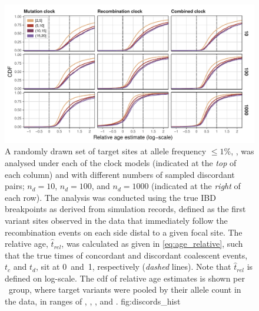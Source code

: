 

\begin{figure}[!htb]
\includegraphics[width=\textwidth]{./img/ch5/discords_hist}
{A randomly drawn set of  target sites at allele frequency ${\leq 1\%}$, \ie \fk{[2,20]}, was analysed under each of the  clock models (indicated at the \emph{top} of each column) and with different numbers of sampled discordant pairs; ${n_d = \num{10}}$, ${n_d = \num{100}}$, and ${n_d = \num{1000}}$ (indicated at the \emph{right} of each row).
The analysis was conducted using the true IBD breakpoints as derived from simulation records, defined as the first variant sites observed in the data that immediately follow the  recombination events on each side distal to a given focal site.
The relative age, ${\hat{t}_\textit{rel}}$, was calculated as given in \cref{eq:age_relative}, such that the true times of concordant and discordant coalescent events, $t_c$ and $t_d$, sit at 0~and~1, respectively (\emph{dashed} lines).
Note that ${\hat{t}_\textit{rel}}$ is defined on log-scale.
The \gls{cdf} of relative age estimates is shown per \fk{}~group, where target variants were pooled by their allele count in the data, in ranges of \fk{[2,5]}, \fk{(5,10]}, \fk{(10,15]}, and \fk{(15,20]}.}
{fig:discords_hist}
\end{figure}
